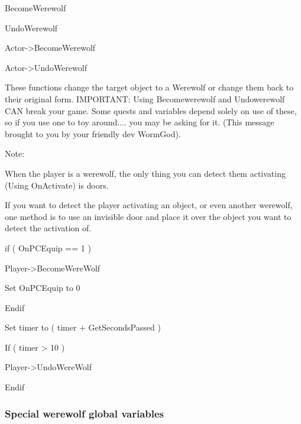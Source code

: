 \documentclass[
]{article}
\begin{document}
BecomeWerewolf

UndoWerewolf

Actor-\textgreater BecomeWerewolf

Actor-\textgreater UndoWerewolf

These functions change the target object to a Werewolf or change them
back to their original form. IMPORTANT: Using Becomewerewolf and
Undowerewolf CAN break your game. Some quests and variables depend
solely on use of these, so if you use one to toy around.... you may be
asking for it. (This message brought to you by your friendly dev
WormGod).

Note:

When the player is a werewolf, the only thing you can detect them
activating (Using OnActivate) is doors.

If you want to detect the player activating an object, or even another
werewolf, one method is to use an invisible door and place it over the
object you want to detect the activation of.

if ( OnPCEquip == 1 )

Player-\textgreater BecomeWereWolf

Set OnPCEquip to 0

Endif

Set timer to ( timer + GetSecondsPassed )

If ( timer \textgreater{} 10 )

Player-\textgreater UndoWereWolf

Endif

\hypertarget{section-8}{%
\subsubsection{}\label{section-8}}

\hypertarget{section-9}{%
\subsubsection{}\label{section-9}}

\hypertarget{section-10}{%
\subsubsection{}\label{section-10}}

\hypertarget{special-werewolf-global-variables}{%
\subsubsection{Special werewolf global
variables}\label{special-werewolf-global-variables}}
\end{document}
